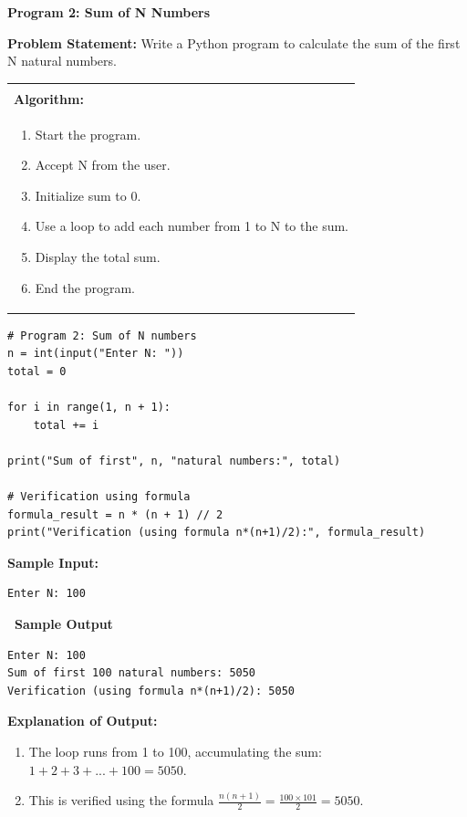 \documentclass[12pt,a4paper]{article}
\makeatletter
\newcommand{\outhead}{\noindent\colorbox{cmrgreen!25}%
  {\textbf{\small\color{cmrdark}~Sample Output~}}\par\vspace{-1pt}}
\newenvironment{algobox}{%
  \par\vspace{4pt}%
  \noindent\begin{tabular}{@{}p{\linewidth}@{}}%
  \hline\\[-8pt]%
  \textbf{\color{blue!60!black}\small Algorithm:}\\[2pt]%
}{%
  \\[-4pt]\hline%
  \end{tabular}\par\vspace{4pt}%
}
\makeatother
\begin{document}
\vspace{0.5cm}

\textbf{Program 2: Sum of N Numbers}

\textbf{Problem Statement:}
Write a Python program to calculate the sum of the first N natural numbers.

\begin{algobox}
\begin{enumerate}[label=Step \arabic*:]
  \item Start the program.
  \item Accept N from the user.
  \item Initialize sum to 0.
  \item Use a loop to add each number from 1 to N to the sum.
  \item Display the total sum.
  \item End the program.
\end{enumerate}
\end{algobox}

\begin{lstlisting}
# Program 2: Sum of N numbers
n = int(input("Enter N: "))
total = 0

for i in range(1, n + 1):
    total += i

print("Sum of first", n, "natural numbers:", total)

# Verification using formula
formula_result = n * (n + 1) // 2
print("Verification (using formula n*(n+1)/2):", formula_result)
\end{lstlisting}

\textbf{Sample Input:}
\begin{verbatim}
Enter N: 100
\end{verbatim}

\outhead
\begin{lstlisting}[style=outputstyle]
Enter N: 100
Sum of first 100 natural numbers: 5050
Verification (using formula n*(n+1)/2): 5050
\end{lstlisting}

\textbf{Explanation of Output:}
\begin{enumerate}
  \item The loop runs from 1 to 100, accumulating the sum: $1 + 2 + 3 + ... + 100 = 5050$.
  \item This is verified using the formula $\frac{n(n+1)}{2} = \frac{100 \times 101}{2} = 5050$.
\end{enumerate}

\vspace{0.5cm}
\end{document}
